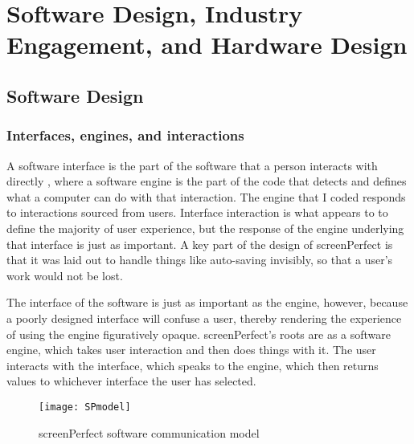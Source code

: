 
\chapter{Software Design, Industry Engagement, and Hardware Design} %
\label{Chapter3} %




\section{Software Design}
\subsection{Interfaces, engines, and interactions}

A software interface is the part of the software that a person interacts with directly \parencite{interactiondestext}, where a software engine is the part of the code that detects and defines what a computer can do with that interaction. The engine that I coded responds to interactions sourced from users. Interface interaction is what appears to to define the majority of user experience, but the response of the engine underlying that interface is just as important. A key part of the design of screenPerfect is that it was laid out to handle things like auto-saving invisibly, so that a user's work would not be lost.

The interface of the software is just as important as the engine, however, because a poorly designed interface will confuse a user, thereby rendering the experience of using the engine figuratively opaque. screenPerfect's roots are as a software engine, which takes user interaction and then does things with it. The user interacts with the interface, which speaks to the engine, which then returns values to whichever interface the user has selected.

\begin{figure}[h]
  \caption{screenPerfect software communication model}
  \centering
    \texttt{[image: SPmodel]}
\end{figure}


